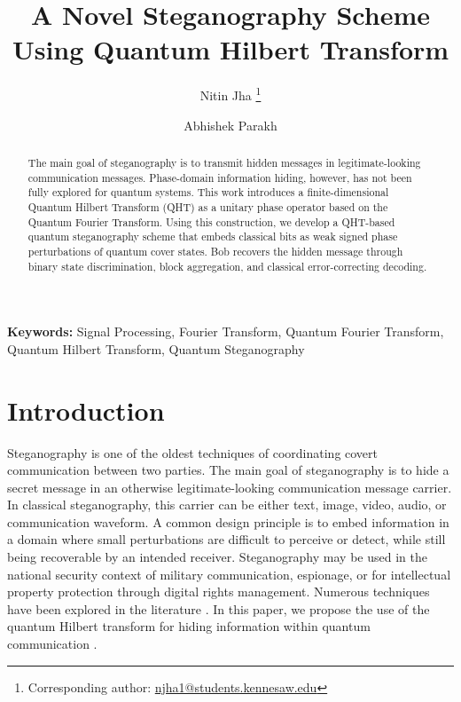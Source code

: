 \documentclass[11pt]{article}
\title{A Novel Steganography Scheme Using Quantum Hilbert Transform}
\author[1]{Nitin Jha%
\thanks{Corresponding author:
\href{mailto:njha1@students.kennesaw.edu}
{njha1@students.kennesaw.edu}}}
\author[1]{Abhishek Parakh}
\affil[1]{Kennesaw State University, Marietta, GA, USA}
\date{}
\theoremstyle{plain}
\theoremstyle{definition}
\theoremstyle{remark}
\begin{document}
\maketitle

\begin{abstract}
The main goal of steganography is to transmit hidden messages in legitimate-looking communication messages. Phase-domain information hiding, however, has not been fully explored for quantum systems. This work introduces a finite-dimensional Quantum Hilbert Transform (QHT) as a unitary phase operator based on the Quantum Fourier Transform. Using this construction, we develop a QHT-based quantum steganography scheme that embeds classical bits as weak signed phase perturbations of quantum cover states. Bob recovers the hidden message through binary state discrimination, block aggregation, and classical error-correcting decoding.
\end{abstract}

\noindent\textbf{Keywords:}
Signal Processing, Fourier Transform, Quantum Fourier Transform,
Quantum Hilbert Transform, Quantum Steganography

\vspace{1em}

\section{Introduction}

Steganography is one of the oldest techniques of coordinating covert communication between two parties. The main goal of steganography is to hide a secret message in an otherwise legitimate-looking communication message carrier. In classical steganography, this carrier can be either text, image, video, audio, or communication waveform. A common design principle is to embed information in a domain where small perturbations are difficult to perceive or detect, while still being recoverable by an intended receiver. Steganography may be used in the national security context of military communication, espionage, or for intellectual property protection through digital rights management. Numerous techniques have been explored in the literature \citep{hameed2022literature}. In this paper, we propose the use of the quantum Hilbert transform for hiding information within quantum communication \citep{jha2025quantumhilbert}.
\end{document}
